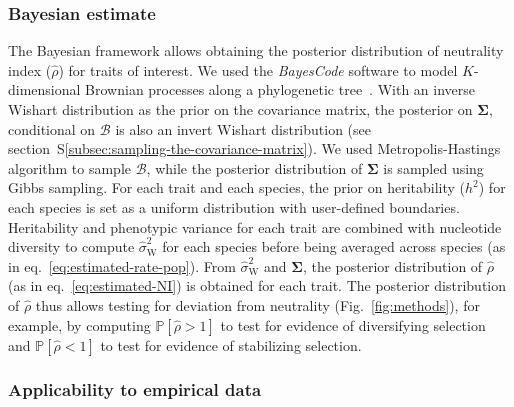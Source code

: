 \documentclass{article}
\newcommand{\UniDimArray}[1]{\bm{#1}}
\newcommand{\BiDimArray}[1]{\bm{#1}}
\newcommand{\proba}{\mathbb{P}}
\newcommand{\Heritability}{h^2}
\newcommand{\EstRateWhithin}{\widehat{\sigma}^2_{\mathrm{W}}}
\newcommand{\EstNI}{\widehat{\rho}}
\newcommand{\Ntrait}{K}
\newcommand{\Covariancematrix}{\Sigma}
\newcommand{\CovarianceMatrix}{\BiDimArray{\Covariancematrix}}
\newcommand{\brownian}{\mathcal{B}}
\newcommand{\Brownian}{\UniDimArray{\brownian}}
\begin{document}
\subsubsection*{Bayesian estimate}
The Bayesian framework allows obtaining the posterior distribution of neutrality index ($\EstNI$) for traits of interest.
We used the \textit{BayesCode} software to model $\Ntrait$-dimensional Brownian processes along a phylogenetic tree~\citep{latrille_inferring_2021}.
With an inverse Wishart distribution as the {prior} on the covariance matrix, the {posterior} on $\CovarianceMatrix$, conditional on $\brownian$ is also an invert Wishart distribution (see section~S\ref{subsec:sampling-the-covariance-matrix}).
We used Metropolis-Hastings algorithm to sample $\Brownian$, while the posterior distribution of $\CovarianceMatrix$ is sampled using Gibbs sampling.
For each trait and each species, the prior on heritability ($\Heritability$) for each species is set as a uniform distribution with user-defined boundaries.
Heritability and phenotypic variance for each trait are combined with nucleotide diversity to compute $\EstRateWhithin$ for each species before being averaged across species (as in eq.~\ref{eq:estimated-rate-pop}).
From $\EstRateWhithin$ and $\CovarianceMatrix$, the posterior distribution of $\EstNI$ (as in eq.~\ref{eq:estimated-NI}) is obtained for each trait.
The posterior distribution of $\EstNI$ thus allows testing for deviation from neutrality (Fig.~\ref{fig:methods}), for example, by computing $\proba [\EstNI > 1 ]$ to test for evidence of diversifying selection and $\proba [\EstNI < 1 ]$ to test for evidence of stabilizing selection.

\subsubsection*{Applicability to empirical data}
\end{document}
